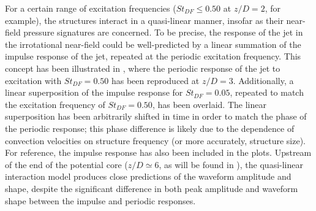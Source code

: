For a certain range of excitation frequencies ($St_{DF} \leq 0.50$ at $z/D = 2$, for example), the structures interact in a quasi-linear manner, insofar as their near-field pressure signatures are concerned. 
To be precise, the response of the jet in the irrotational near-field could be well-predicted by a linear summation of the impulse response of the jet, repeated at the periodic excitation frequency. 
This concept has been illustrated in , where the periodic response of the jet to excitation with $St_{DF} = 0.50$ has been reproduced at $z/D = 3$. 
Additionally, a linear superposition of the impulse response for $St_{DF} = 0.05$, repeated to match the excitation frequency of $St_{DF} = 0.50$, has been overlaid. 
The linear superposition has been arbitrarily shifted in time in order to match the phase of the periodic response; this phase difference is likely due to the dependence of convection velocities on structure frequency \citep{Veltin2011} (or more accurately, structure size). 
For reference, the impulse response has also been included in the plots. 
Upstream of the end of the potential core ($z/D \simeq 6$, as will be found in ), the quasi-linear interaction model produces close predictions of the waveform amplitude and shape, despite the significant difference in both peak amplitude and waveform shape between the impulse and periodic responses. 

